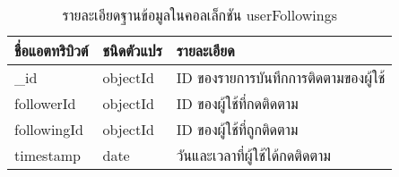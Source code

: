 \begin{table}
    \caption{รายละเอียดฐานข้อมูลในคอลเล็กชัน userFollowings}
    \begin{tabularx}{\textwidth}{ | l | l | X | }
        \hline
        \bf ชื่อแอตทริบิวต์ & \bf ชนิดตัวแปร & \bf รายละเอียด \\\hline
        \_id & objectId & ID ของรายการบันทึกการติดตามของผู้ใช้\\\hline
        followerId & objectId & ID ของผู้ใช้ที่กดติดตาม\\\hline
        followingId & objectId & ID ของผู้ใช้ที่ถูกติดตาม\\\hline
        timestamp & date & วันและเวลาที่ผู้ใช้ได้กดติดตาม\\\hline
    \end{tabularx}
\end{table}

\clearpage
